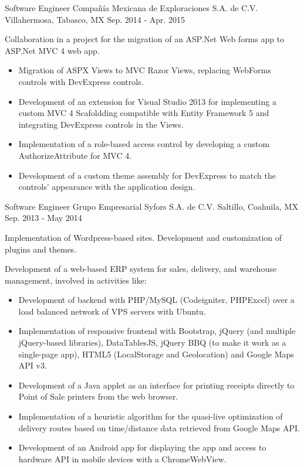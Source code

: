 \begin{cventries}
\cventry
{Software Engineer} %
{Compañía Mexicana de Exploraciones S.A. de C.V.} %
{Villahermosa, Tabasco, MX} %
{Sep. 2014 - Apr. 2015} %
{ %
	\begin{cvitems}
		\item {Collaboration in a project for the migration of an ASP.Net Web forms app to ASP.Net MVC 4 web app.}
		\begin{itemize}
			\item {Migration of ASPX Views to MVC Razor Views, replacing WebForms controls with DevExpress controls.}
			\item {Development of an extension for Visual Studio 2013 for implementing a custom MVC 4 Scafoldding compatible with Entity Framework 5 and integrating DevExpress controls in the Views.}
			\item {Implementation of a role-based access control by developing a custom AuthorizeAttribute for MVC 4. }
			\item {Development of a custom theme assembly for DevExpress to match the controls' appearance with the application design.}
		\end{itemize}
	\end{cvitems}
}


\cventry
{Software Engineer} %
{Grupo Empresarial Syfors S.A. de C.V.} %
{Saltillo, Coahuila, MX} %
{Sep. 2013 - May 2014} %
{ %
	\begin{cvitems}
		\item {Implementation of Wordpress-based sites. Development and customization of plugins and themes.}
		\item {Development of a web-based ERP system for sales, delivery, and warehouse management, involved in activities like:}
		\begin{itemize}
			\item {Development of backend with PHP/MySQL (Codeigniter, PHPExcel) over a load balanced network of VPS servers with Ubuntu.}
			\item {Implementation of responsive frontend with Bootstrap, jQuery (and multiple jQuery-based libraries), DataTablesJS, jQuery BBQ (to make it work as a single-page app), HTML5 (LocalStorage and Geolocation) and Google Maps API v3.}
			\item {Development of a Java applet as an interface for printing receipts directly to Point of Sale printers from the web browser.}
			\item {Implementation of a heuristic algorithm for the quasi-live optimization of delivery routes based on time/distance data retrieved from Google Maps API.}
			\item {Development of an Android app for displaying the app and access to hardware API in mobile devices with a ChromeWebView.}
		\end{itemize}
	\end{cvitems} 
}


\end{cventries}
